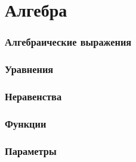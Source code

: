 \part{Алгебра}
\section{Алгебраические выражения}
	
\section{Уравнения}
	
\section{Неравенства}
\section{Функции}
	
\section{Параметры}

